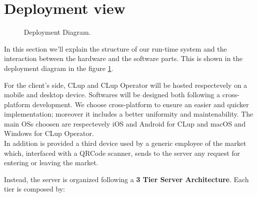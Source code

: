 \section{Deployment view}


\begin{figure}[H]
  \centering
    \caption{Deployment Diagram.}
      \label{fig:deployment}
\end{figure}



In this section we'll explain the structure of our run-time system and the interaction between the hardware and the software parts. This is shown in the deployment diagram in the figure \ref{fig:deployment}. \bigskip

For the client's side, CLup and CLup Operator will be hosted respectevely on a mobile and desktop device. Softwares will be designed both following a cross-platform development. 
We choose cross-platform to ensure an easier and quicker implementation; moreover it includes a better uniformity and maintenability.   
The main OSs choosen are respectevely iOS and Android for CLup and macOS and Windows for CLup Operator.\\
In addition is provided a third device used by a generic employee of the market which, interfaced with a QRCode scanner, sends to the server any request for entering or leaving  the market. \pagebreak

Instead, the server is organized following a \textbf{3 Tier Server Architecture}. Each tier is composed by:


